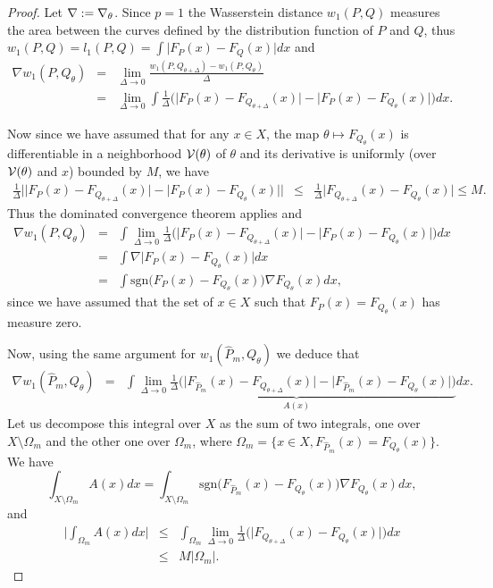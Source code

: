 \documentclass{article}
\newcommand{\beqan}{\begin{eqnarray*}}
\newcommand{\eeqan}{\end{eqnarray*}}
\def \sgn {\text{sgn}}
\def \gradtheta {{\grad_\theta}}
\begin{document}
\begin{proof}
Let $\grad := \gradtheta$. Since $p=1$ the Wasserstein distance $w_1(P,Q)$ measures the area between the curves defined by the distribution function of $P$ and $Q$, thus
$w_1(P,Q) = l_1(P,Q) = \int \big| F_{P}(x)-F_{Q}(x)\big| dx$ and
\beqan
\nabla w_1(P,Q_\theta)&=&\lim_{\Delta\rightarrow 0} \frac{w_1(P,Q_{\theta+\Delta})- w_1(P,Q_{\theta})}{\Delta}\\
&=& \lim_{\Delta\rightarrow 0} \int \frac 1{\Delta} \Big( \big| F_{P}(x)-F_{Q_{\theta+\Delta}}(x)\big| - \big| F_{P}(x)-F_{Q_\theta}(x)\big| \Big) dx.
\eeqan

Now since we have assumed that for any $x\in X$, the map $\theta\mapsto F_{Q_{\theta}}(x)$ is differentiable in a neighborhood ${\cal V}(\theta)$ of $\theta$ and its derivative is uniformly (over ${\cal V}(\theta)$ and $x$) bounded by $M$, we have
\beqan
\frac 1{\Delta} \Big| \big| F_{P}(x)-F_{Q_{\theta+\Delta}}(x)\big| - \big| F_{P}(x)-F_{Q_\theta}(x)\big| \Big|
&\leq & \frac 1{\Delta} \big| F_{Q_{\theta+\Delta}}(x) - F_{Q_\theta}(x)\big| \leq M.
\eeqan
Thus the dominated convergence theorem applies and
\beqan
\nabla w_1(P,Q_\theta)&=&\int \lim_{\Delta\rightarrow 0} \frac 1{\Delta} \Big( \big| F_{P}(x)-F_{Q_{\theta+\Delta}}(x)\big| - \big| F_{P}(x)-F_{Q_\theta}(x)\big| \Big) dx\\
&=& \int \nabla \big| F_{P}(x)-F_{Q_\theta}(x)\big| dx \\
&=& \int \sgn\big( F_{P}(x)-F_{Q_\theta}(x)\big) \nabla F_{Q_\theta}(x) dx,
\eeqan
since we have assumed that the set of $x\in X$ such that $F_{P}(x)=F_{Q_\theta}(x)$ has measure zero.

Now, using the same argument for $w_1(\hat P_m,Q_\theta)$ we deduce that
\beqan
\nabla w_1(\hat P_m,Q_\theta)&=&\int \underbrace{ \lim_{\Delta\rightarrow 0} \frac 1{\Delta} \Big( \big| F_{\hat P_m}(x)-F_{Q_{\theta+\Delta}}(x)\big| - \big| F_{\hat P_m}(x)-F_{Q_\theta}(x)\big| \Big)}_{A(x)} dx.
\eeqan
Let us decompose this integral over $X$ as the sum of two integrals, one over $X\setminus \Omega_m$ and the other one over $\Omega_m$, where $\Omega_m = \big\{x\in X, F_{\hat P_m}(x)=F_{Q_\theta}(x)\big\}$. We have
$$\int_{X\setminus \Omega_m} A(x) dx = \int_{X\setminus \Omega_m} \sgn\big( F_{\hat P_m}(x)-F_{Q_\theta}(x)\big) \nabla F_{Q_\theta}(x) dx,$$
and
\beqan
\Big| \int_{\Omega_m} A(x) dx  \Big| 
&\leq & \int_{\Omega_m} \lim_{\Delta\rightarrow 0} \frac 1{\Delta} \Big( \big| F_{Q_{\theta+\Delta}}(x)-F_{Q_\theta}(x)\big| \Big) dx \\
&\leq & M |\Omega_m |.
\eeqan


\end{proof}
\end{document}
